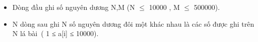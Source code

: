 \begin{itemize}
	\item Dòng đầu ghi số nguyên dương N,M (N $\le$ 10000 , M $\le$ 500000).
	\item N dòng sau ghi N số nguyên dương đôi một khác nhau là các số được ghi trên N lá bài ( 1 ≤ a[i] ≤ 10000).
\end{itemize}